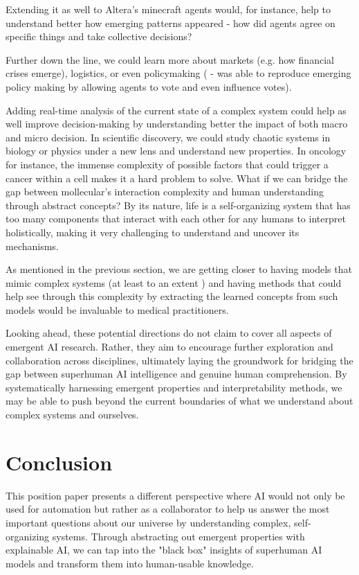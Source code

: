 \documentclass[11pt]{article}
\begin{document}
Extending it as well to Altera's minecraft agents \cite{altera} would, for instance, help to understand better how emerging patterns appeared - how did agents agree on specific things and take collective decisions? 

Further down the line, we could learn more about markets (e.g. how financial crises emerge), logistics, or even policymaking (\cite{altera} - was able to reproduce emerging policy making by allowing agents to vote and even influence votes).

Adding real-time analysis of the current state of a complex system could help as well improve decision-making by understanding better the impact of both macro and micro decision.
In scientific discovery, we could study chaotic systems in biology or physics under a new lens and understand new properties. In oncology for instance, the immense complexity of possible factors that could trigger a cancer within a cell makes it a hard problem to solve. What if we can bridge the gap between mollecular's interaction complexity and human understanding through abstract concepts? By its nature, life is a self-organizing system that has too many components that interact with each other for any humans to interpret holistically, making it very challenging to understand and uncover its mechanisms.

As mentioned in the previous section, we are getting closer to having models that mimic complex systems (at least to an extent \cite{alphafold}) and having methods that could help see through this complexity by extracting the learned concepts from such models would be invaluable to medical practitioners.

Looking ahead, these potential directions do not claim to cover all aspects of emergent AI research. Rather, they aim to encourage further exploration and collaboration across disciplines, ultimately laying the groundwork for bridging the gap between superhuman AI intelligence and genuine human comprehension. By systematically harnessing emergent properties and interpretability methods, we may be able to push beyond the current boundaries of what we understand about complex systems and ourselves.

\section{Conclusion}
This position paper presents a different perspective where AI would not only be used for automation but rather as a collaborator to help us answer the most important questions about our universe by understanding complex, self-organizing systems. Through abstracting out emergent properties with explainable AI, we can tap into the "black box" insights of superhuman AI models and transform them into human-usable knowledge.
\end{document}
